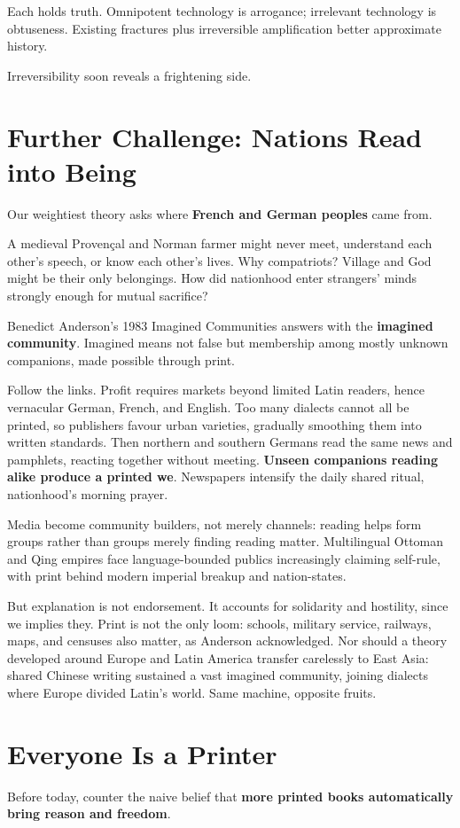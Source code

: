 Each holds truth. Omnipotent technology is arrogance; irrelevant technology is obtuseness. Existing fractures plus irreversible amplification better approximate history.

Irreversibility soon reveals a frightening side.

\section[Further Challenge: Reading Nations]{Further Challenge: Nations Read into Being}
Our weightiest theory asks where \textbf{French and German peoples} came from.

A medieval Provençal and Norman farmer might never meet, understand each other's speech, or know each other's lives. Why compatriots? Village and God might be their only belongings. How did nationhood enter strangers' minds strongly enough for mutual sacrifice?

Benedict Anderson's 1983 Imagined Communities answers with the \textbf{imagined community}. Imagined means not false but membership among mostly unknown companions, made possible through print.

Follow the links. Profit requires markets beyond limited Latin readers, hence vernacular German, French, and English. Too many dialects cannot all be printed, so publishers favour urban varieties, gradually smoothing them into written standards. Then northern and southern Germans read the same news and pamphlets, reacting together without meeting. \textbf{Unseen companions reading alike produce a printed we}. Newspapers intensify the daily shared ritual, nationhood's morning prayer.

Media become community builders, not merely channels: reading helps form groups rather than groups merely finding reading matter. Multilingual Ottoman and Qing empires face language-bounded publics increasingly claiming self-rule, with print behind modern imperial breakup and nation-states.

But explanation is not endorsement. It accounts for solidarity and hostility, since we implies they. Print is not the only loom: schools, military service, railways, maps, and censuses also matter, as Anderson acknowledged. Nor should a theory developed around Europe and Latin America transfer carelessly to East Asia: shared Chinese writing sustained a vast imagined community, joining dialects where Europe divided Latin's world. Same machine, opposite fruits.

\section{Everyone Is a Printer}
Before today, counter the naive belief that \textbf{more printed books automatically bring reason and freedom}.


